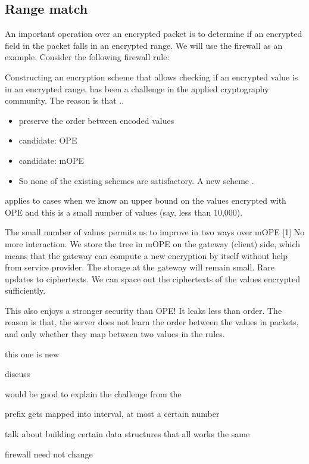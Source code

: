 \subsection{Range match}
An important operation over an encrypted packet is to determine if an encrypted field in the packet falls in an encrypted range.
We will use the firewall as an example. 
Consider the following firewall rule:

Constructing an encryption scheme that allows checking if an encrypted value is in an encrypted range, has been a challenge in the applied cryptography community. The reason is that ..

\begin{itemize}
\item preserve the order between encoded values
\item candidate: OPE
\item candidate: mOPE
\item So none of the existing schemes are satisfactory. A new scheme \RM.
\end{itemize}

\RM applies to cases when we know an upper bound on the values encrypted with OPE and this is a small number of values (say, less than 10,000).

The small number of values permits us to improve in two ways over mOPE [1]
No more interaction. We store the tree in mOPE on the gateway (client) side, which means that the gateway can compute a new encryption by itself without help from service provider. The storage at the gateway will remain small.
Rare updates to ciphertexts. We can space out the ciphertexts of the values encrypted sufficiently. 

This also enjoys a stronger security than OPE! It leaks less than order.
The reason is that, the server does not learn the order between the values in packets, and only whether they map between two values in the rules. 

this one is new

discuss 

would be good to explain the challenge from the 


prefix gets mapped into interval, at most a certain number

talk about building certain data structures that all works the same

firewall need not change 
